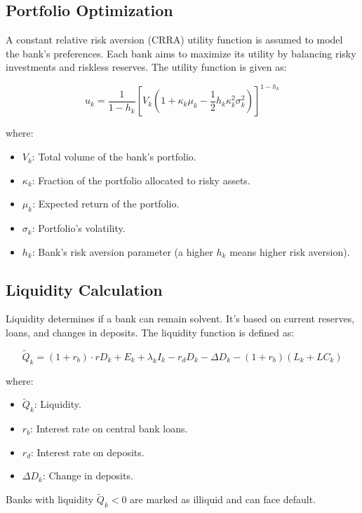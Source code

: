 \documentclass{article} %
\begin{document}
\subsection{Portfolio Optimization}

A constant relative risk aversion (CRRA) utility function is assumed to model the bank’s preferences. Each bank aims to maximize its utility by balancing risky investments and riskless reserves. The utility function is given as:

\[
u_k = \frac{1}{1 - h_k} \left[ V_k \left( 1 + \kappa_k \mu_k - \frac{1}{2} h_k \kappa_k^2 \sigma_k^2 \right) \right]^{1 - h_k}
\]

where:
\begin{itemize}
    \item \( V_k \): Total volume of the bank’s portfolio.
    \item \( \kappa_k \): Fraction of the portfolio allocated to risky assets.
    \item \( \mu_k \): Expected return of the portfolio.
    \item \( \sigma_k \): Portfolio’s volatility.
    \item \( h_k \): Bank's risk aversion parameter (a higher \( h_k \) means higher risk aversion).
\end{itemize}

\subsection{Liquidity Calculation}

Liquidity determines if a bank can remain solvent. It’s based on current reserves, loans, and changes in deposits. The liquidity function is defined as:

\[
\tilde{Q}_k = (1 + r_b) \cdot r D_k + E_k + \lambda_k I_k - r_d D_k - \Delta D_k - (1 + r_b) (L_k + LC_k)
\]

where:
\begin{itemize}
    \item \( \tilde{Q}_k \): Liquidity.
    \item \( r_b \): Interest rate on central bank loans.
    \item \( r_d \): Interest rate on deposits.
    \item \( \Delta D_k \): Change in deposits.
\end{itemize}

Banks with liquidity \( \tilde{Q}_k < 0 \) are marked as illiquid and can face default.
\end{document}
